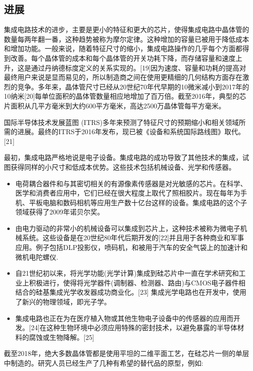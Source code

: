 \subsection{进展}

集成电路技术的进步，主要是更小的特征和更大的芯片，使得集成电路中晶体管的数量每两年翻一番，这种趋势被称为摩尔定律。这种增加的容量已被用于降低成本和增加功能。一般来说，随着特征尺寸的缩小，集成电路操作的几乎每个方面都得到改善。每个晶体管的成本和每个晶体管的开关功耗下降，而存储容量和速度上升，这是通过丹纳德标度定义的关系实现的。[19]因为速度、容量和功耗的提高对最终用户来说是显而易见的，所以制造商之间在使用更精细的几何结构方面存在激烈的竞争。多年来，晶体管尺寸已经从20世纪70年代早期的10微米减小到2017年的10纳米[20]每单位面积的晶体管数量相应地增加了百万倍。截至2016年，典型的芯片面积从几平方毫米到大约600平方毫米，高达2500万晶体管每平方毫米。

国际半导体技术发展蓝图 (ITRS)多年来预测了特征尺寸的预期缩小和相关领域所需的进展。最终的ITRS于2016年发布，现已被《设备和系统国际路线图》取代。[21]

最初，集成电路严格地说是电子设备。集成电路的成功导致了其他技术的集成，试图获得同样的小尺寸和低成本优势。这些技术包括机械设备、光学和传感器。

\begin{itemize}
\item 电荷耦合器件和与其密切相关的有源像素传感器是对光敏感的芯片。在科学、医学和消费者应用中，它们已经在很大程度上取代了照相胶片。现在每年为手机、平板电脑和数码相机等应用生产数十亿台这样的设备。集成电路的这个子领域获得了2009年诺贝尔奖。
\item 由电力驱动的非常小的机械设备可以集成到芯片上，这种技术被称为微电子机械系统。这些设备是在20世纪80年代后期开发的[22]并且用于各种商业和军事应用。例子包括DLP投影仪，喷码机，和被用于汽车的安全气袋上的加速计和微机电陀螺仪.
\item 自21世纪初以来，将光学功能(光学计算)集成到硅芯片中一直在学术研究和工业上积极进行，使得将光学器件(调制器、检测器、路由)与CMOS电子器件相结合的硅基集成光学收发器成功商业化。[23] 集成光学电路也在开发中，使用了新兴的物理领域，即光子学。
\item 集成电路也正在为在医疗植入物或其他生物电子设备中的传感器的应用而开发。[24]在这种生物环境中必须应用特殊的密封技术，以避免暴露的半导体材料的腐蚀或生物降解。[25]
\end{itemize}

截至2018年，绝大多数晶体管都是使用平坦的二维平面工艺，在硅芯片一侧的单层中制造的。研究人员已经生产了几种有希望的替代品的原型，例如:

